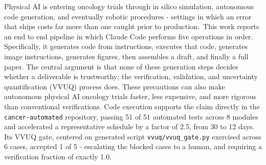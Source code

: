 
Physical AI is entering oncology trials through in silico simulation,
autonomous code generation, and eventually robotic procedures - settings in which
an error that ships costs far more than one caught prior to production.\ This work
reports an end to end pipeline in which Claude Code performs five operations in order. Specifically, it generates code from instructions, executes that code, generates image instructions, generates figures, then assembles a draft, and finally a full
paper. The central argument is that none of these generation steps decides
whether a deliverable is trustworthy; the verification, validation, and
uncertainty quantification (VVUQ) process does. These precautions can also make autonomous physical AI oncology trials faster, less
expensive, and more rigorous than conventional verifications. Code execution supports the claim directly in the
\texttt{cancer-automated} repository, passing 51 of 51 automated tests across 8
modules and accelerated a representative schedule by a factor of 2.5, from 30 to 12 days. Its VVUQ gate, centered on generated script \texttt{vvuq/vvuq\_gate.py} exercised across 6 cases, accepted 1 of 5 - escalating the blocked cases to a human, and requiring a verification fraction of exactly 1.0. 

